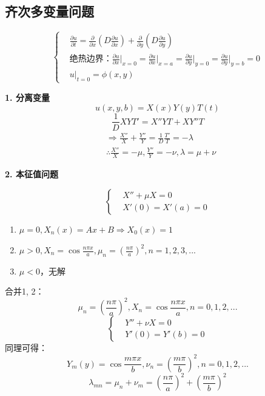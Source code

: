 \subsection{齐次多变量问题}
\begin{ex}[二维扩散问题]
    $$\left\{
        \begin{aligned}
        &
        \frac{\partial{u}}{\partial{t}}=\frac{\partial}{\partial x}\left(D\frac{\partial{u}}{\partial{x}}\right) +\frac{\partial}{\partial y}\left(D\frac{\partial{u}}{\partial{y}}\right)\\
        &\text{绝热边界：}\frac{\partial{u}}{\partial x}\bigg|_{x=0}=\frac{\partial{u}}{\partial x}\bigg|_{x=a}=\frac{\partial{u}}{\partial y}\bigg|_{y=0}=\frac{\partial{u}}{\partial y}\bigg|_{y=b}=0\\
        &u|_{t=0}=\phi(x,y)
                \end{aligned}
        \right.
        $$

\noindent\textbf{1. 分离变量}
$$u(x,y,b)=X(x)Y(y)T(t)$$
$$\frac{1}{D}XYT'=X''YT+XY''T$$
$$\begin{aligned}
&\Rightarrow \frac{X''}{X}+\frac{Y''}{Y}=\frac{1}{D}\frac{T'}{T}=-\lambda\\
&\therefore\frac{X''}{X}=-\mu,\frac{Y''}{Y}=-\nu,\lambda=\mu+\nu
\end{aligned}$$

\noindent\textbf{2. 本征值问题}

$$\left\{
    \begin{aligned}
    &X''+\mu X=0\\
    &X'(0)=X'(a)=0
            \end{aligned}
    \right.$$
\begin{enumerate}
    \item{$\mu=0, X_n(x)=Ax+B\Rightarrow X_0(x)=1$}
    \item{$\mu>0,X_n=\cos{\frac{n\pi x}{a}},\mu_ n=\left(\frac{n\pi}{a}\right)^2,n=1,2,3,...$}
    \item {$\mu<0$，无解}
\end{enumerate}
合并1, 2：$$\mu_ n=\left(\frac{n\pi}{a}\right)^2, X_n=\cos{\frac{n\pi x}{a}}, n=0,1,2,...$$
        $$\left\{
    \begin{aligned}
    &Y''+\nu X=0\\
    &Y'(0)=Y'(b)=0
            \end{aligned}
    \right.$$
同理可得：
        $$Y_m(y)=\cos{\frac{m\pi x}{b}},\nu_ n=\left(\frac{m\pi}{b}\right)^2,n=0,1,2,...$$
        $$\lambda_{mn}=\mu_ n+\nu_ m=\left(\frac{n\pi}{a}\right)^2+\left(\frac{m\pi}{b}\right)^2$$
        

\end{ex}
